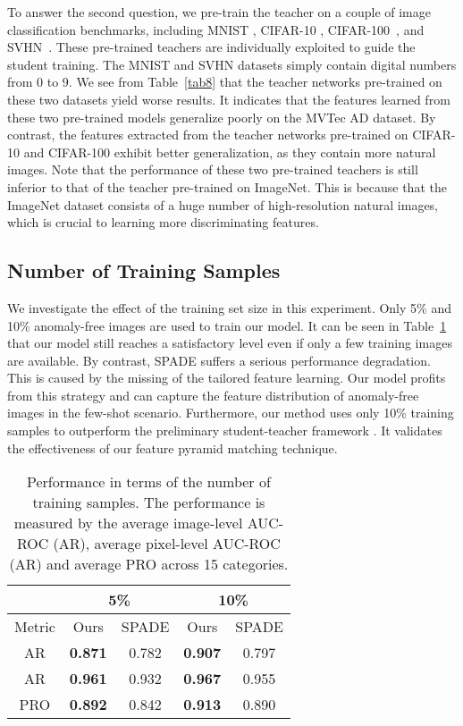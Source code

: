 \documentclass{bmvc2k}
\begin{document}
To answer the second question, we pre-train the teacher on a couple of image classification benchmarks, including MNIST \cite{yann2010mnist}, CIFAR-10 \cite{Krizhevsky2009}, CIFAR-100~\cite{Krizhevsky2009}, and SVHN~\cite{Netzer2011}. These pre-trained teachers are individually exploited to guide the student training. The MNIST and SVHN datasets simply contain digital numbers from 0 to 9. We see from Table~\ref{tab8} that the teacher networks pre-trained on these two datasets yield worse results. It indicates that the features learned from these two pre-trained models generalize poorly on the MVTec AD dataset. By contrast, the features extracted from the teacher networks pre-trained on CIFAR-10 and CIFAR-100 exhibit better generalization, as they contain more natural images. Note that the performance of these two pre-trained teachers is still inferior to that of the teacher pre-trained on ImageNet. This is because that the ImageNet dataset consists of a huge number of high-resolution natural images, which is crucial to learning more discriminating features.


\subsection{Number of Training Samples}
\label{sec5:sub4}
We investigate the effect of the training set size in this experiment. Only 5\% and 10\% anomaly-free images are used to train our model. It can be seen in Table~\ref{tab9} that our model still reaches a satisfactory level even if only a few training images are available. By contrast, SPADE suffers a serious performance degradation. This is caused by the missing of the tailored feature learning. Our model profits from this strategy and can capture the feature distribution of anomaly-free images in the few-shot scenario. Furthermore, our method uses only 10\% training samples to outperform the preliminary student-teacher framework \cite{Bergmann2020}. It validates the effectiveness of our feature pyramid matching technique.


\begin{table}[!]
	\centering
	\begin{adjustbox}{width=0.5\textwidth}
		\begin{tabular}{c|cc|cc}
			\hline
			& \multicolumn{2}{c|}{5\%} & \multicolumn{2}{c}{10\%} \\
			\hline
			Metric & Ours & SPADE & Ours & SPADE \\
			\hline
			AR & \textbf{0.871} & 0.782 & \textbf{0.907} & 0.797 \\
			AR & \textbf{0.961} & 0.932 & \textbf{0.967} & 0.955 \\
			PRO & \textbf{0.892} & 0.842 & \textbf{0.913} & 0.890 \\
			\hline
		\end{tabular}
	\end{adjustbox}
	\caption{Performance in terms of the number of training samples. The performance is measured by the average image-level AUC-ROC (AR), average pixel-level AUC-ROC (AR) and average PRO across 15 categories.}
	\label{tab9}
\end{table}
\end{document}

